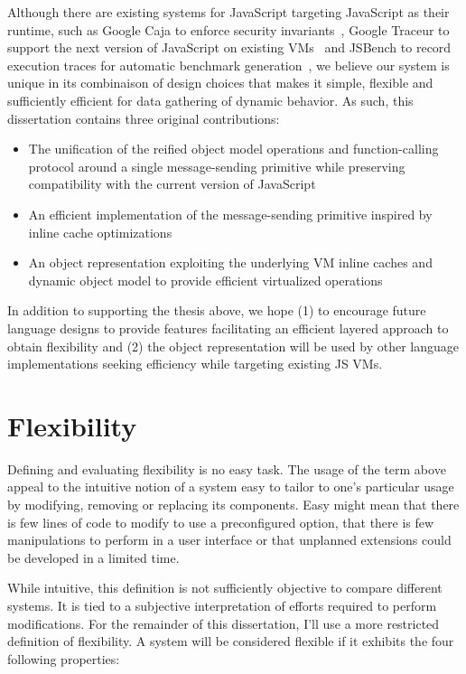Although there are existing systems for JavaScript targeting JavaScript as
their runtime, such as Google Caja to enforce security
invariants~\cite{Caja:2012}, Google Traceur to support the next version of
JavaScript on existing VMs~\cite{Traceur:2012} and JSBench to record execution
traces for automatic benchmark generation~\cite{Richards:2011}, we believe our
system is unique in its combinaison of design choices that makes it simple,
flexible and sufficiently efficient for data gathering of dynamic behavior. As
such, this dissertation contains three original contributions: 
\begin{itemize}
    \item The unification of the reified object model operations and
        function-calling protocol around a single message-sending primitive
        while preserving compatibility with the current version of JavaScript
    \item An efficient implementation of the message-sending primitive inspired
          by inline cache optimizations
    \item An object representation exploiting the underlying VM inline caches
          and dynamic object model to provide efficient virtualized operations
\end{itemize}

In addition to supporting the thesis above, we hope (1) to encourage future
language designs to provide features facilitating an efficient layered approach
to obtain flexibility and (2) the object representation will be used by other
language implementations seeking efficiency while targeting existing JS VMs.

\section{Flexibility}

Defining and evaluating flexibility is no easy task. The usage of the term
above appeal to the intuitive notion of a system easy to tailor to one's
particular usage by modifying, removing or replacing its components. Easy might
mean that there is few lines of code to modify to use a preconfigured option,
that there is few manipulations to perform in a user interface or that unplanned
extensions could be developed in a limited time.

While intuitive, this definition is not sufficiently objective to compare
different systems. It is tied to a subjective interpretation of efforts required to
perform modifications. For the remainder of this dissertation, I'll use a more
restricted definition of flexibility. A system will be considered flexible if
it exhibits the four following properties:

